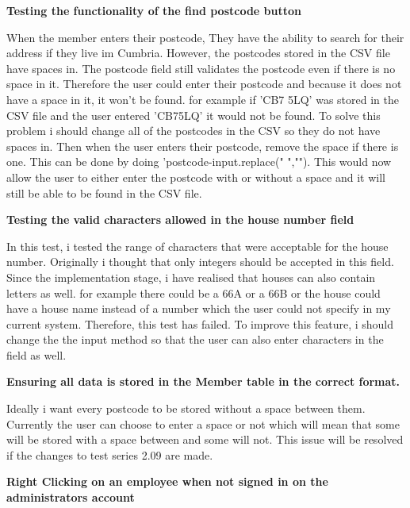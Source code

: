 \textbf{Testing the functionality of the find postcode button}

When the member enters their postcode, They have the ability to search for their address if they live im Cumbria. However, the postcodes stored in the CSV file have spaces in. The postcode field still validates the postcode even if there is no space in it. Therefore the user could enter their postcode and because it does not have a space in it, it won't be found. for example if 'CB7 5LQ' was stored in the CSV file and the user entered 'CB75LQ' it would not be found. To solve this problem i should change all of the postcodes in the CSV so they do not have spaces in. Then when the user enters their postcode, remove the space if there is one. This can be done by doing 'postcode-input.replace(" ",""). This would now allow the user to either enter the postcode with or without a space and it will still be able to be found in the CSV file.

\textbf{Testing the valid characters allowed in the house number field}

In this test, i tested the range of characters that were acceptable for the house number. Originally i thought that only integers should be accepted in this field. Since the implementation stage, i have realised that houses can also contain letters as well. for example there could be a 66A or a 66B or the house could have a house name instead of a number which the user could not specify in my current system. Therefore,  this test has failed. To improve this feature, i should change the the input method so that the user can also enter characters in the field as well.

\textbf{Ensuring all data is stored in the Member table in the correct format.}

 Ideally i want every postcode to be stored without a space between them. Currently the user can choose to enter a space or not which will mean that some will be stored with a space between and some will not. This issue will be resolved if the changes to test series 2.09 are made.

\textbf{Right Clicking on an employee when not signed in on the administrators account}

